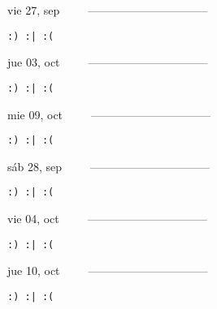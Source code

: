 \documentclass[letterpaper,10pt]{article}
\begin{document}
\begin{multicols}{3}
{vie 27, sep\ \ \ \ \ --------------------------------}
\begin{flushright}\begin{small}\texttt{:) :| :(}\end{small}\end{flushright}
\vfill
{jue 03, oct\ \ \ \ \ --------------------------------}
\begin{flushright}\begin{small}\texttt{:) :| :(}\end{small}\end{flushright}\par
\vfill
{mie 09, oct\ \ \ \ \ --------------------------------}
\begin{flushright}\begin{small}\texttt{:) :| :(}\end{small}\end{flushright}\par
\vfill
\end{multicols}
\vspace{1.05cm}

\begin{multicols}{3}
{sáb 28, sep\ \ \ \ \ --------------------------------}
\begin{flushright}\begin{small}\texttt{:) :| :(}\end{small}\end{flushright}
\vfill
{vie 04, oct\ \ \ \ \ --------------------------------}
\begin{flushright}\begin{small}\texttt{:) :| :(}\end{small}\end{flushright}\par
\vfill
{jue 10, oct\ \ \ \ \ --------------------------------}
\begin{flushright}\begin{small}\texttt{:) :| :(}\end{small}\end{flushright}\par
\vfill
\end{multicols}
\vspace{1.05cm}
\end{document}
